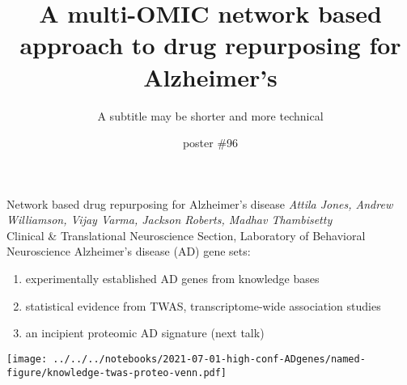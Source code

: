 \documentclass[aspectratio=169]{beamer}
\title{A multi-OMIC network based approach to drug repurposing for Alzheimer's}
\subtitle{A subtitle may be shorter and more technical}
\author{poster \#96}
\date{}
\begin{document}
\begin{frame}{Network based drug repurposing for Alzheimer's disease}
	{\emph{Attila Jones, Andrew Williamson, Vijay Varma, Jackson Roberts, Madhav Thambisetty}\\
		Clinical \& Translational Neuroscience Section, Laboratory of Behavioral Neuroscience}
	{\Large Alzheimer's disease (AD) gene sets:}
\begin{enumerate}
\item experimentally established AD genes from \alert{knowledge} bases
\item statistical evidence from \alert{TWAS}, transcriptome-wide association studies
\item an \alert{incipient proteo}mic AD signature (next talk)
\end{enumerate}

\begin{center}
\texttt{[image: ../../../notebooks/2021-07-01-high-conf-ADgenes/named-figure/knowledge-twas-proteo-venn.pdf]}
\end{center}
\begin{columns}[t]
\begin{column}{0.5\textwidth}
\end{column}

\begin{column}{0.5\textwidth}

\end{column}
\end{columns}
\end{frame}
\end{document}
